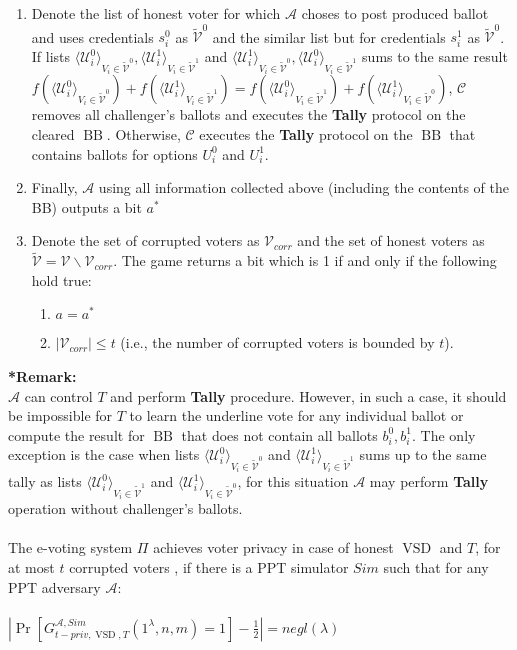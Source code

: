 \documentclass[12pt]{article}
\DeclareMathOperator{\vsd}{VSD}
\DeclareMathOperator{\bb}{BB}
\begin{document}
\begin{enumerate}
\item Denote the list of honest voter for which $\mathcal{A}$ choses to post produced ballot and uses credentials $s_i^0$  as $ \tilde{\mathcal{V}}^0$ and the similar list but for credentials $s_i^1$ as $ \tilde{\mathcal{V}}^0$.  If  lists $\langle \mathcal{U}^0_i \rangle _{V_i \in \tilde{\mathcal{V}}^0}, \langle \mathcal{U}^1_i \rangle _{V_i \in \tilde{\mathcal{V}}^1}$ and $\langle \mathcal{U}^1_i \rangle _{V_i \in \tilde{\mathcal{V}}^0}, \langle \mathcal{U}^0_i \rangle _{V_i \in \tilde{\mathcal{V}}^1}$ sums to the same result $f(\langle \mathcal{U}^0_i \rangle _{V_i \in \tilde{\mathcal{V}}^0} ) + f(\langle \mathcal{U}^1_i \rangle _{V_i \in \tilde{\mathcal{V}}^1} ) =  f(\langle \mathcal{U}^0_i \rangle _{V_i \in \tilde{\mathcal{V}}^1} ) +  f(\langle \mathcal{U}^1_i \rangle _{V_i \in \tilde{\mathcal{V}}^0} )$, $\mathcal{C}$ removes all challenger's ballots and executes the \textbf{Tally} protocol on the cleared $\bb$. Otherwise, $\mathcal{C}$ executes the \textbf{Tally} protocol on the $\bb$ that contains ballots for options $U_i^0$ and $U_i^1$. 
\item Finally, $\mathcal{A}$ using all information collected above (including the contents of the BB) outputs a bit $a^*$
\item Denote the set of corrupted voters as $\mathcal{V}_{corr}$ and the set of honest voters as $\tilde{\mathcal{V}}= \mathcal{V} \backslash \mathcal{V}_{corr}$. The game returns a bit which is 1 if and only if the following hold true:
\begin{enumerate}
 \item $a = a^*$
 \item $|\mathcal{V}_{corr}| \leq t$ (i.e., the number of corrupted voters is bounded by $t$).
\end{enumerate}
\end{enumerate}
\textbf{*Remark:}\\
$\mathcal{A}$ can control $T$ and perform \textbf{Tally} procedure. However, in such a case, it should be impossible for $T$ to learn the underline vote for any individual ballot or compute the result for $\bb$ that does not contain all ballots $b_i^0,b_i^1$. The only exception is the case when lists  $\langle \mathcal{U}^0_i \rangle _{V_i \in \tilde{\mathcal{V}}^0} $ and  $\langle \mathcal{U}^1_i \rangle _{V_i \in \tilde{\mathcal{V}}^1} $ sums up to the same tally as lists  $\langle \mathcal{U}^0_i \rangle _{V_i \in \tilde{\mathcal{V}}^1} $ and  $\langle \mathcal{U}^1_i \rangle _{V_i \in \tilde{\mathcal{V}}^0} $, for this situation $\mathcal{A}$ may perform \textbf{Tally} operation without challenger's ballots. \\\\
The e-voting system $\Pi$ achieves voter privacy in case of honest $\vsd$ and $T$, for at most $t$ corrupted voters , if there is a PPT simulator $Sim$ such that for any PPT adversary $\mathcal{A}$:\\\\
 $|\Pr[G_{t-priv,\vsd,T}^{\mathcal{A},Sim}(1^{\lambda},n,m) = 1] - \frac{1}{2}| = negl(\lambda)$
\end{document}
